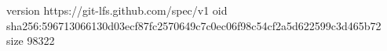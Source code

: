 version https://git-lfs.github.com/spec/v1
oid sha256:596713066130d03ecf87fc2570649c7c0ec06f98c54cf2a5d622599c3d465b72
size 98322
